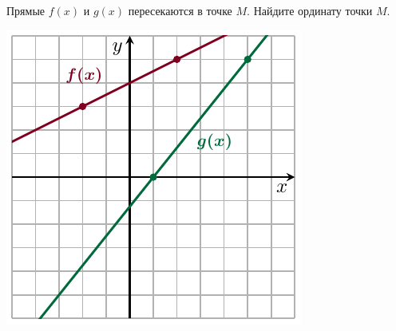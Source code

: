 \begin{minipage}[t]{0.7\textwidth}
	Прямые $f(x)$ и $g(x)$ пересекаются в точке $M$. Найдите ординату точки $M$.
\end{minipage}
\begin{minipage}[c]{0.25\textwidth}
	\includegraphics[align=t, width=\textwidth]{graphs/graph_24/graph_24}
\end{minipage}